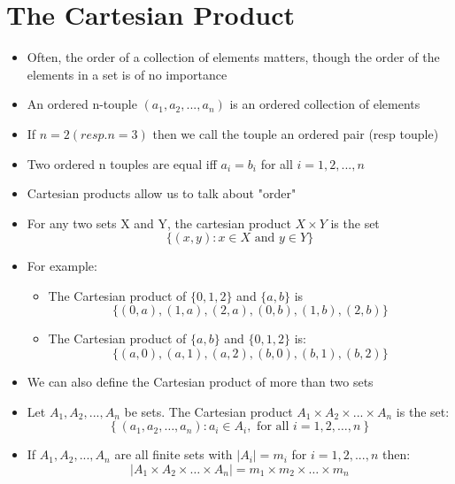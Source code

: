 \documentclass{article}[18pt]
\begin{document}
\section{The Cartesian Product}
\begin{itemize}
	\item Often, the order of a collection of elements matters, though the order of the elements in a set is of no importance
	\item An ordered n-touple $(a_1,a_2,...,a_n)$ is an ordered collection of elements
	\item If $n=2(resp. n=3)$ then we call the touple an ordered pair (resp touple)
	\item Two ordered n touples are equal iff $a_i=b_i$ for all $i=1,2,...,n$
	\item Cartesian products allow us to talk about "order"
	\item For any two sets X and Y, the cartesian product $X\times Y$ is the set
	$$\{ ( x , y ) : x \in X \text { and } y \in Y \}$$
	\item For example:
	\begin{itemize}
		\item The Cartesian product of $\{0,1,2\}$ and $\{a,b\}$ is
		$$\{ ( 0 , a ) , ( 1 , a ) , ( 2 , a ) , ( 0 , b ) , ( 1 , b ) , ( 2 , b ) \}$$
		\item The Cartesian product of $\{a,b\}$ and $\{0,1,2\}$ is:
		$$\{ ( a , 0 ) , ( a , 1 ) , ( a , 2 ) , ( b , 0 ) , ( b , 1 ) , ( b , 2 ) \}$$
	\end{itemize}
	\item We can also define the Cartesian product of more than two sets
	\item Let $A_1,A_2,...,A_n$ be sets. The Cartesian product $A_1\times A_2 \times ...\times A_n$ is the set:
	$$\left\{ \left( a _ { 1 } , a _ { 2 } , \dots , a _ { n } \right) : a _ { i } \in A _ { i } , \text { for all } i = 1,2 , \ldots , n \right\}$$
	\item If $A_1,A_2,...,A_n$ are all finite sets with $|A_i|=m_i$ for $i=1,2,...,n$ then:
	$$\left| A _ { 1 } \times A _ { 2 } \times \ldots \times A _ { n } \right| = m _ { 1 } \times m _ { 2 } \times \ldots \times m _ { n }$$
\end{itemize}
\end{document}
